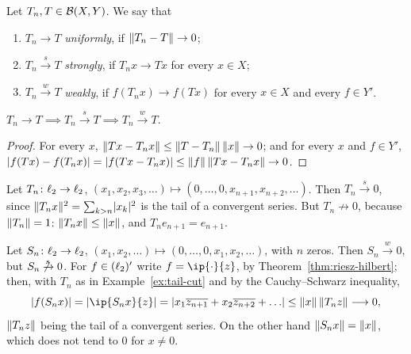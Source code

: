 \begin{definition}\label{def:operator-convergence}
Let $T_n, T \in \mathcal{B}(X, Y)$. We say that
\begin{enumerate}
  \item $T_n \to T$ \emph{uniformly}, if $\lVert T_n - T\rVert \to 0$;
  \item $T_n \xrightarrow{s} T$ \emph{strongly}, if $T_n x \to Tx$ for every
    $x \in X$;
  \item $T_n \xrightarrow{w} T$ \emph{weakly}, if $f(T_n x) \to f(Tx)$ for
    every $x \in X$ and every $f \in Y'$.
\end{enumerate}
\end{definition}

\begin{proposition}\label{prop:convergence-implications}
$T_n \to T \implies T_n \xrightarrow{s} T \implies T_n \xrightarrow{w} T$.
\end{proposition}

\begin{proof}
For every $x$, $\lVert Tx - T_n x\rVert \le \lVert T - T_n\rVert\,\lVert x\rVert \to 0$; and
for every $x$ and $f \in Y'$,
$\lvert f(Tx) - f(T_n x)\rvert = \lvert f(Tx - T_n x)\rvert
\le \lVert f\rVert\,\lVert Tx - T_n x\rVert \to 0$.
\end{proof}

\begin{example}\label{ex:tail-cut}
Let $T_n \colon \ell_{2} \to \ell_{2}$,
$(x_1, x_2, x_3, \dots) \mapsto (0, \dots, 0, x_{n+1}, x_{n+2}, \dots)$. Then
$T_n \xrightarrow{s} 0$, since $\lVert T_n x\rVert^2 = \sum_{k > n} \lvert x_k\rvert^2$ is
the tail of a convergent series. But $T_n \not\to 0$, because
$\lVert T_n\rVert = 1$: $\lVert T_n x\rVert \le \lVert x\rVert$, and $T_n e_{n+1} = e_{n+1}$.
\end{example}

\begin{example}\label{ex:shift-weak}
Let $S_n \colon \ell_{2} \to \ell_{2}$,
$(x_1, x_2, \dots) \mapsto (0, \dots, 0, x_1, x_2, \dots)$, with $n$ zeros.
Then $S_n \xrightarrow{w} 0$, but $S_n \not\xrightarrow{s} 0$. For
$f \in (\ell_{2})'$ write $f = \ip{\cdot}{z}$, by
Theorem~\ref{thm:riesz-hilbert}; then, with $T_n$ as in
Example~\ref{ex:tail-cut} and by the Cauchy--Schwarz inequality,
\[
  \abs{f(S_n x)} = \abs{\ip{S_n x}{z}}
  = \abs{x_1 \overline{z_{n+1}} + x_2 \overline{z_{n+2}} + \dots}
  \le \norm{x}\,\norm{T_n z} \longrightarrow 0 ,
\]
$\lVert T_n z\rVert$ being the tail of a convergent series. On the other hand
$\lVert S_n x\rVert = \lVert x\rVert$, which does not tend to $0$ for $x \ne 0$.
\end{example}

